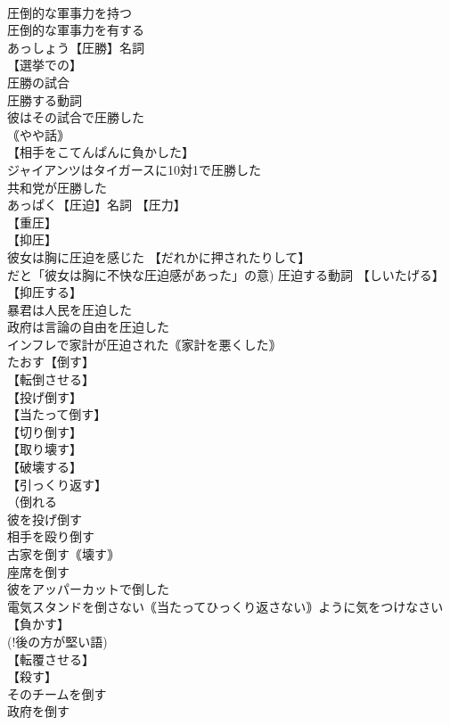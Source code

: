 \documentclass[8pt]{extreport}
\begin{document}
\begin{CJK}{UTF8}{min}
\\	圧倒的な軍事力を持つ 
\\	圧倒的な軍事力を有する 
\\	あっしょう【圧勝】名詞 
\\	【選挙での】
\\	圧勝の試合 
\\	圧勝する動詞 
\\	彼はその試合で圧勝した 
\\	｟やや話｠
\\	【相手をこてんぱんに負かした】
\\	ジャイアンツはタイガースに10対1で圧勝した 
\\	共和党が圧勝した 
\\	あっぱく【圧迫】名詞 【圧力】
\\	【重圧】
\\	【抑圧】
\\	彼女は胸に圧迫を感じた 【だれかに押されたりして】
\\	だと「彼女は胸に不快な圧迫感があった」の意) 圧迫する動詞 【しいたげる】
\\	【抑圧する】
\\	暴君は人民を圧迫した 
\\	政府は言論の自由を圧迫した 
\\	インフレで家計が圧迫された｟家計を悪くした｠ 
\\	たおす【倒す】 
\\	【転倒させる】 
\\	【投げ倒す】
\\	【当たって倒す】
\\	【切り倒す】
\\	【取り壊す】
\\	【破壊する】
\\	【引っくり返す】
\\	（倒れる
\\	彼を投げ倒す 
\\	相手を殴り倒す 
\\	古家を倒す｟壊す｠ 
\\	座席を倒す 
\\	彼をアッパーカットで倒した 
\\	電気スタンドを倒さない｟当たってひっくり返さない｠ように気をつけなさい 
\\	【負かす】 
\\	(!後の方が堅い語) 
\\	【転覆させる】
\\	【殺す】
\\	そのチームを倒す 
\\	政府を倒す 

\end{CJK}
\end{document}

